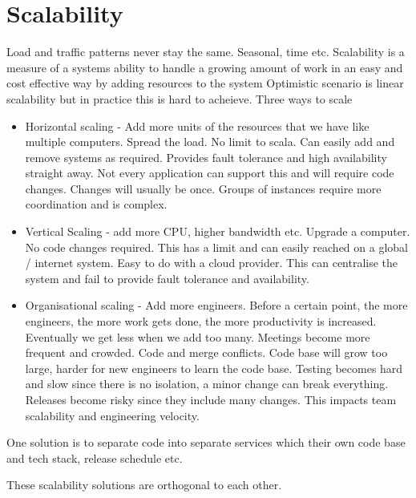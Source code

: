 \documentclass[a4paper, 11pt]{book}
\begin{document}
    \section{Scalability}
    Load and traffic patterns never stay the same.
    Seasonal, time etc.
    Scalability is a measure of a systems ability to handle a growing amount of work in an easy and cost effective way by adding resources to the system
    Optimistic scenario is linear scalability but in practice this is hard to acheieve.
    Three ways to scale
    \begin{itemize}
        \item Horizontal scaling - Add more units of the resources that we have like multiple computers.
        Spread the load.
        No limit to scala.
        Can easily add and remove systems as required.
        Provides fault tolerance and high availability straight away.
        Not every application can support this and will require code changes.
        Changes will usually be once.
        Groups of instances require more coordination and is complex.
        \item Vertical Scaling - add more CPU, higher bandwidth etc.
        Upgrade a computer.
        No code changes required.
        This has a limit and can easily reached on a global / internet system.
        Easy to do with a cloud provider.
        This can centralise the system and fail to provide fault tolerance and availability.
        \item Organisational scaling - Add more engineers.
        Before a certain point, the more engineers, the more work gets done, the more productivity is increased.
        Eventually we get less when we add too many.
        Meetings become more frequent and crowded.
        Code and merge conflicts.
        Code base will grow too large, harder for new engineers to learn the code base.
        Testing becomes hard and slow since there is no isolation, a minor change can break everything.
        Releases become risky since they include many changes.
        This impacts team scalability and engineering velocity.
    \end{itemize}
    One solution is to separate code into separate services which their own code base and tech stack, release schedule etc.

    These scalability solutions are orthogonal to each other.
\end{document}
